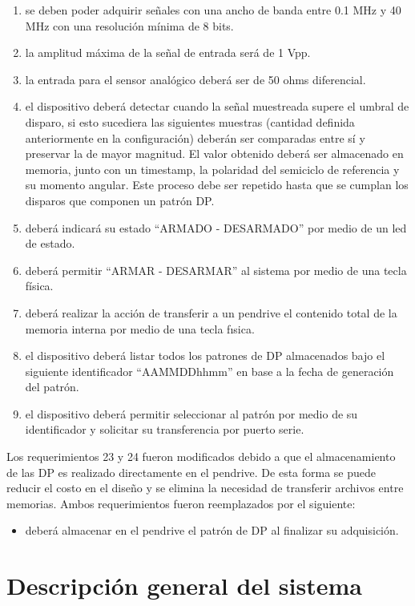 \begin{enumerate}[label=\textbf{Req \arabic*}]
\item se deben poder adquirir señales con una ancho de banda entre 0.1 MHz y 40 MHz con una resolución mínima de 8 bits.
\item la amplitud máxima de la señal de entrada será de 1 Vpp.
\item la entrada para el sensor analógico deberá ser de 50 ohms diferencial.
\item el dispositivo deberá detectar cuando la señal muestreada supere el umbral de disparo, si esto sucediera las siguientes muestras (cantidad definida anteriormente en la configuración) deberán ser comparadas entre sí y preservar la de mayor magnitud. El valor obtenido deberá ser almacenado en memoria, junto con un timestamp, la polaridad del semiciclo de referencia y su momento angular. Este proceso debe ser repetido hasta que se cumplan los disparos que componen un patrón DP.
\item deberá indicará su estado “ARMADO - DESARMADO” por medio de un led de estado.
\item \label{req:23}deberá permitir “ARMAR - DESARMAR” al sistema por medio de una tecla física.
\item \label{req:24}deberá realizar la acción de transferir a un pendrive el contenido total de la memoria interna por medio de una tecla fısica.
\item el dispositivo deberá listar todos los patrones de DP almacenados bajo el siguiente identificador “AAMMDDhhmm” en base a la fecha de generación del patrón.
\item el dispositivo deberá permitir seleccionar al patrón por medio de su identificador y solicitar su transferencia por puerto serie.
\end{enumerate}

Los requerimientos 23 y 24 fueron modificados debido a que el almacenamiento de las DP es realizado directamente en el pendrive. De esta forma se puede reducir el costo en el diseño y se elimina la necesidad de transferir archivos entre memorias. Ambos requerimientos fueron reemplazados por el siguiente:
\begin{itemize}
\item deberá almacenar en el pendrive el patrón de DP al finalizar su adquisición.
\end{itemize}


\section{Descripción general del sistema}

